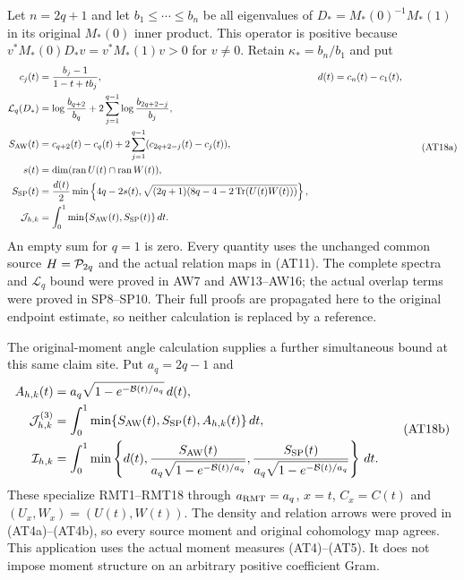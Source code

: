 Let $n=2q+1$ and let $b_1\le\cdots\le b_n$ be all eigenvalues of
$D_*=M_*(0)^{-1}M_*(1)$ in its original $M_*(0)$ inner product.
This operator is positive because
$v^*M_*(0)D_*v=v^*M_*(1)v>0$ for $v\ne0$.
Retain $\kappa_*=b_n/b_1$ and put
\[
 \begin{aligned}
 c_j(t)&=\frac{b_j-1}{1-t+tb_j},&
 d(t)&=c_n(t)-c_1(t),\\
 \mathcal L_q(D_*)&=\log\frac{b_{q+2}}{b_q}
       +2\sum_{j=1}^{q-1}\log\frac{b_{2q+2-j}}{b_j},\\
 S_{\rm AW}(t)&=c_{q+2}(t)-c_q(t)
       +2\sum_{j=1}^{q-1}(c_{2q+2-j}(t)-c_j(t)),\\
 s(t)&=\dim(\operatorname{ran}U(t)\cap\operatorname{ran}W(t)),\\
 S_{\rm SP}(t)&=\frac{d(t)}2\min\left\{
       4q-2s(t),\sqrt{(2q+1)(8q-4-2\operatorname{Tr}(U(t)W(t)))}\right\},\\
 \mathcal J_{h,k}&=\int_0^1\min\{S_{\rm AW}(t),S_{\rm SP}(t)\}\,dt.
 \end{aligned}
 \tag{AT18a}
\]
An empty sum for $q=1$ is zero. Every quantity uses the unchanged
common source $H=\mathcal P_{2q}$ and the actual relation maps in (AT11).
The complete spectra and $\mathcal L_q$ bound were proved in
AW7 and AW13--AW16; the actual overlap terms were proved in
SP8--SP10. Their full proofs are propagated here to the original
endpoint estimate, so neither calculation is replaced by a reference.


The original-moment angle calculation supplies a further simultaneous
bound at this same claim site. Put $a_q=2q-1$ and
\[
 \begin{aligned}
 A_{h,k}(t)&=a_q\sqrt{1-e^{-\mathcal B(t)/a_q}}\,d(t),\\
 \mathcal J_{h,k}^{(3)}
   &=\int_0^1\min\{S_{\rm AW}(t),S_{\rm SP}(t),A_{h,k}(t)\}\,dt,\\
 \mathcal I_{h,k}
   &=\int_0^1\min\left\{d(t),
   \frac{S_{\rm AW}(t)}{a_q\sqrt{1-e^{-\mathcal B(t)/a_q}}},
   \frac{S_{\rm SP}(t)}{a_q\sqrt{1-e^{-\mathcal B(t)/a_q}}}\right\}\,dt .
 \end{aligned}
 \tag{AT18b}
\]
These specialize RMT1--RMT18 through $a_{\rm RMT}=a_q$, $x=t$, $C_x=C(t)$ and
$(U_x,W_x)=(U(t),W(t))$. The density and relation arrows were
proved in (AT4a)--(AT4b), so every source moment and original
cohomology map agrees. This application uses the actual moment
measures (AT4)--(AT5). It does not impose moment structure on an
arbitrary positive coefficient Gram.

